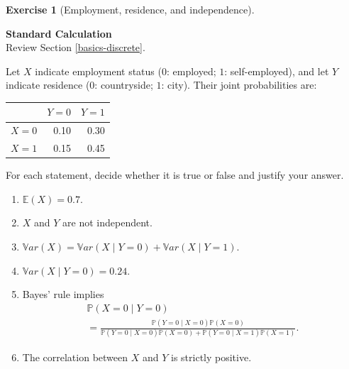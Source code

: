 \documentclass[
  11pt,
]{book}
\providecommand{\tightlist}{%
  \setlength{\itemsep}{0pt}\setlength{\parskip}{0pt}}
\theoremstyle{definition}
\theoremstyle{definition}
\theoremstyle{definition}
\newtheorem{exercise}{Exercise}[chapter]
\theoremstyle{definition}
\theoremstyle{remark}
\begin{document}

\begin{exercisebox}

\begin{exercise}[Employment, residence, and independence]
\protect\hypertarget{exr:basics-joint-probabilities}{}\label{exr:basics-joint-probabilities}

\textbf{Standard \textbar{} Calculation}\\
Review Section \ref{basics-discrete}.

Let \(X\) indicate employment status (\(0\): employed; \(1\): self-employed), and let \(Y\) indicate residence (\(0\): countryside; \(1\): city). Their joint probabilities are:

\begin{longtable}[]{@{}lrr@{}}
\toprule\noalign{}
& \(Y=0\) & \(Y=1\) \\
\midrule\noalign{}
\endhead
\bottomrule\noalign{}
\endlastfoot
\(X=0\) & 0.10 & 0.30 \\
\(X=1\) & 0.15 & 0.45 \\
\end{longtable}

For each statement, decide whether it is true or false and justify your answer.

\begin{enumerate}
\def\labelenumi{\arabic{enumi}.}
\tightlist
\item
  \(\mathbb{E}(X)=0.7\).
\item
  \(X\) and \(Y\) are not independent.
\item
  \(\mathbb{V}ar(X)=\mathbb{V}ar(X\mid Y=0)+\mathbb{V}ar(X\mid Y=1)\).
\item
  \(\mathbb{V}ar(X\mid Y=0)=0.24\).
\item
  Bayes' rule implies
  \[
  \begin{gathered}
  \mathbb{P}(X=0\mid Y=0)\\
  =\frac{\mathbb{P}(Y=0\mid X=0)\mathbb{P}(X=0)}
  {\mathbb{P}(Y=0\mid X=0)\mathbb{P}(X=0)+\mathbb{P}(Y=0\mid X=1)\mathbb{P}(X=1)}.
  \end{gathered}
  \]
\item
  The correlation between \(X\) and \(Y\) is strictly positive.
\end{enumerate}

\end{exercise}

\end{exercisebox}

\end{document}
